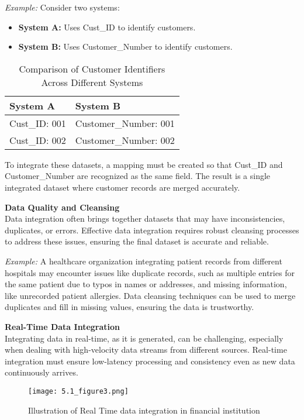 \documentclass[12pt]{article}
\begin{document}
\textit{Example:} Consider two systems:
\begin{itemize}
    \item \textbf{System A:} Uses Cust\_ID to identify customers.
    \item \textbf{System B:} Uses Customer\_Number to identify customers.
\end{itemize}

\begin{table}[H]
    \centering
    \begin{tabular}{|p{4cm}|p{4cm}|}
        \hline
        \textbf{System A} & \textbf{System B} \\ \hline
        Cust\_ID: 001 & Customer\_Number: 001 \\ \hline
        Cust\_ID: 002 & Customer\_Number: 002 \\ \hline
    \end{tabular}
    \caption{Comparison of Customer Identifiers Across Different Systems}
\end{table}

To integrate these datasets, a mapping must be created so that Cust\_ID and Customer\_Number are recognized as the same field. The result is a single integrated dataset where customer records are merged accurately.

\textbf{Data Quality and Cleansing} \\
Data integration often brings together datasets that may have inconsistencies, duplicates, or errors. Effective data integration requires robust cleansing processes to address these issues, ensuring the final dataset is accurate and reliable. 

\textit{Example:} A healthcare organization integrating patient records from different hospitals may encounter issues like duplicate records, such as multiple entries for the same patient due to typos in names or addresses, and missing information, like unrecorded patient allergies. Data cleansing techniques can be used to merge duplicates and fill in missing values, ensuring the data is trustworthy.

\textbf{Real-Time Data Integration} \\
Integrating data in real-time, as it is generated, can be challenging, especially when dealing with high-velocity data streams from different sources. Real-time integration must ensure low-latency processing and consistency even as new data continuously arrives. 
\begin{figure}[H] %
    \begin{center}
        \texttt{[image: 5.1\_figure3.png]}
    \end{center}
    \caption{Illustration of Real Time data integration in financial institution}
\end{figure}
\end{document}
